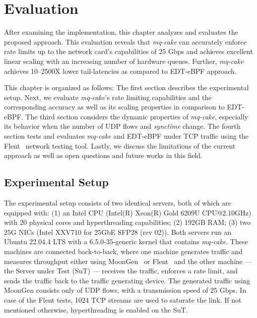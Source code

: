 \section{Evaluation}\label{sec:evaluation}
After examining the implementation, this chapter analyzes and evaluates the proposed approach.
%
This evaluation reveals that \textit{mq-cake} can accurately enforce rate limits up to the network card's capabilities of 25 Gbps and achieves excellent linear scaling with an increasing number of hardware queues.
%
Further, \textit{mq-cake} achieves 10--2500X lower tail-latencies as compared to EDT-eBPF approach.

This chapter is organized as follows:
%
The first section describes the experimental setup. 
%
Next, we evaluate \textit{mq-cake}'s rate limiting capabilities and the corresponding accuracy as well as its scaling properties in comparison to EDT-eBPF.
%
The third section considers the dynamic properties of \textit{mq-cake}, especially its behavior when the number of UDP flows and \textit{synctime} change.
%
The fourth section tests and evaluates \textit{mq-cake} and EDT-eBPF under TCP traffic using the Flent~\cite{flent} network testing tool.
%
Lastly, we discuss the limitations of the current approach as well as open questions and future works in this field.

\subsection{Experimental Setup}
The experimental setup consists of two identical servers, both of which are equipped with: 
(1) an Intel CPU (Intel(R) Xeon(R) Gold 6209U CPU@2.10GHz) with 20 physical cores and hyperthreading capabilities;
(2) 192GB RAM;
(3) two 25G NICs (Intel XXV710 for 25GbE SFP28 (rev 02)).
Both servers run an Ubuntu 22.04.4 LTS with a 6.5.0-35-generic kernel that contains \textit{mq-cake}. 
These machines are connected back-to-back, where one machine generates traffic and measures throughput either using MoonGen~\cite{moongen} or Flent~\cite{flent} and the other machine --- the Server under Test (SuT) --- receives the traffic, enforces a rate limit, and sends the traffic back to the traffic generating device.
%
The generated traffic using MoonGen consists only of UDP flows, with a transmission speed of 25 Gbps.
%
In case of the Flent tests, 1024 TCP streams are used to saturate the link.
%
If not mentioned otherwise, hyperthreading is enabled on the SuT.

